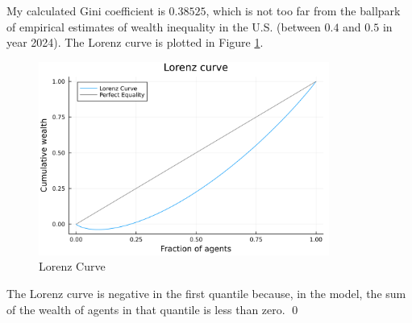 \begin{solution}
    My calculated Gini coefficient is $0.38525$, which is not too far from the ballpark of empirical estimates
    of wealth inequality in the U.S. (between $0.4$ and $0.5$ in year 2024). The Lorenz curve is plotted in Figure \ref{fig:lorenz}.
    \begin{figure}[H]
        \centering
        \includegraphics[width=0.85\textwidth, angle=0]
        {4 Lorenz_Curve.png}
        \caption{Lorenz Curve}
        \label{fig:lorenz}
    \end{figure}
    \begin{remark}
        The Lorenz curve is negative in the
        first quantile because, in the model, the sum of the wealth of agents in that quantile is less than zero. \qed
    \end{remark}
\end{solution}







